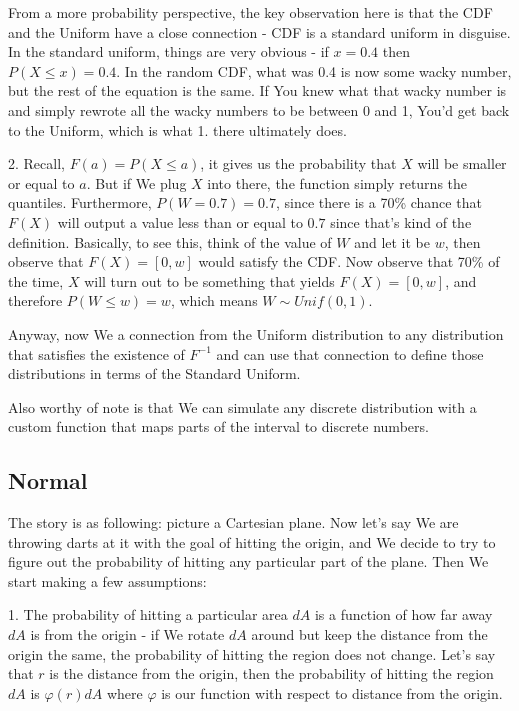 \documentclass{article}
\begin{document}
		From a more probability perspective, the key observation here is that the CDF and the Uniform have a close connection - CDF is a standard uniform in disguise. In the standard uniform, things are very obvious - if $x=0.4$ then $P(X \le x) = 0.4$. In the random CDF, what was 0.4 is now some wacky number, but the rest of the equation is the same. If You knew what that wacky number is and simply rewrote all the wacky numbers to be between 0 and 1, You'd get back to the Uniform, which is what 1. there ultimately does.
		
		2. Recall, $F(a) = P(X \le a)$, it gives us the probability that $X$ will be smaller or equal to $a$. But if We plug $X$ into there, the function simply returns the quantiles. Furthermore, $P(W=0.7) = 0.7$, since there is a 70\% chance that $F(X)$ will output a value less than or equal to $0.7$ since that's kind of the definition. Basically, to see  this, think of the value of $W$ and let it be $w$, then observe that $F(X) = [0, w]$ would satisfy the CDF. Now observe that 70\% of the time, $X$ will turn out to be something that yields $F(X) = [0, w]$, and therefore $P(W \le w) = w$, which means $W\sim Unif(0, 1)$.
		
		Anyway, now We a connection from the Uniform distribution to any distribution that satisfies the existence of $F^{-1}$ and can use that connection to define those distributions in terms of the Standard Uniform. 
		
		Also worthy of note is that We can simulate any discrete distribution with a custom function that maps parts of the interval to discrete numbers.
		
	\subsection{Normal}
	
		The story is as following: picture a Cartesian plane. Now let's say We are throwing darts at it with the goal of hitting the origin, and We decide to try to figure out the probability of hitting any particular part of the plane. Then We start making a few assumptions:
		
		1. The probability of hitting a particular area $dA$ is a function of how far away $dA$ is from the origin - if We rotate $dA$ around but keep the distance from the origin the same, the probability of hitting the region does not change. Let's say that $r$ is the distance from the origin, then the probability of hitting the region $dA$ is $\varphi(r) dA$ where $\varphi$ is our function with respect to distance from the origin.
		
\end{document}
